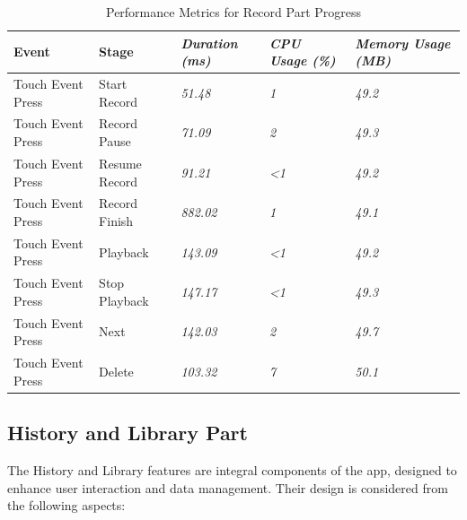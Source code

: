\documentclass[conference,10pt,letterpaper]{IEEEtran}
\begin{document}
	\begin{table}[ht]
		\centering
		\begin{tabularx}{6.2in}{|X|X|X|X|X|}
			\hline
			\textbf{Event} & \textbf{Stage} & \textbf{\textit{Duration (ms)}} & \textbf{\textit{CPU Usage (\%)}} & \textbf{\textit{Memory Usage (MB)}} \\ \hline
			Touch Event Press & Start Record  & \textit{51.48}  & \textit{1}            & \textit{49.2} \\ \hline
			Touch Event Press & Record Pause  & \textit{71.09}  & \textit{2}            & \textit{49.3} \\ \hline
			Touch Event Press & Resume Record & \textit{91.21}  & \textit{\textless{}1} & \textit{49.2} \\ \hline
			Touch Event Press & Record Finish & \textit{882.02} & \textit{1}            & \textit{49.1} \\ \hline
			Touch Event Press & Playback      & \textit{143.09} & \textit{\textless{}1} & \textit{49.2} \\ \hline
			Touch Event Press & Stop Playback & \textit{147.17} & \textit{\textless{}1} & \textit{49.3} \\ \hline
			Touch Event Press & Next          & \textit{142.03} & \textit{2}            & \textit{49.7} \\ \hline
			Touch Event Press & Delete        & \textit{103.32} & \textit{7}            & \textit{50.1} \\ \hline
		\end{tabularx}
		\caption{Performance Metrics for Record Part Progress}
		\label{tab:performance}
	\end{table}
	
	\subsection{History and Library Part}
	The History and Library features are integral components of the app, designed to enhance user interaction and data management. Their design is considered from the following aspects:
	
\end{document}
